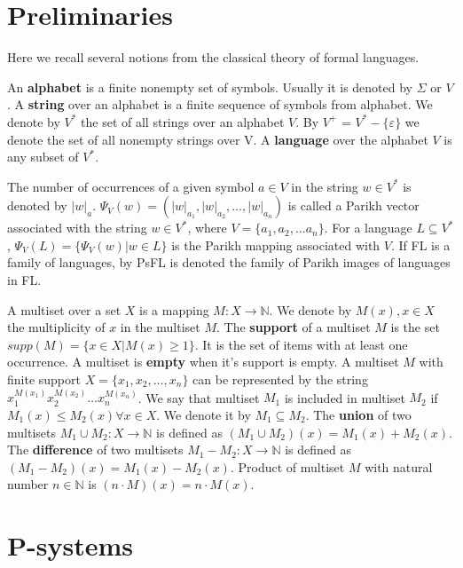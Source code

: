 \documentclass[a4paper,10pt]{article}
\def\eps{\varepsilon}
\begin{document}
\section{Preliminaries}
\label{sec:preliminaries}

Here we recall several notions from the classical theory of formal languages.

An {\bf alphabet} is a finite nonempty set of symbols. Usually it is denoted by $\Sigma$ or $V$. A {\bf string} over an alphabet is a finite sequence of symbols from alphabet. We denote by $V^*$ the set of all strings over an alphabet $V$. By $V^+$ = $V^* - \{\eps\}$ we denote the set of all nonempty strings over V. A {\bf language} over the alphabet $V$ is any subset of $V^*$.

The number of occurrences of a given symbol $a\in V$ in the string $w\in V^*$ is denoted by $|w|_a$. $\Psi_V(w)=(|w|_{a_1},|w|_{a_2},\dots,|w|_{a_n})$ is called a Parikh vector associated with the string $w\in V^*$, where $V=\{a_1,a_2,\dots a_n\}$. For a language $L\subseteq V^*$, $\Psi_V(L)=\{\Psi_V(w)|w\in L\}$ is the Parikh mapping associated with $V$. If FL is a family of languages, by PsFL is denoted the family of Parikh images of languages in FL.

A multiset over a set $X$ is a mapping $M: X\rightarrow \mathbb N$. We denote by $M(x), x\in X$ the multiplicity of $x$ in the multiset $M$. The {\bf support} of a multiset $M$ is the set $supp(M)=\{x\in X|M(x)\geq 1\}$. It is the set of items with at least one occurrence. A multiset is {\bf empty} when it's support is empty. A multiset $M$ with finite support $X = \{x_1, x_2, \dots, x_n\}$ can be represented by the string $x_1^{M(x_1)}x_2^{M(x_2)}\dots x_n^{M(x_n)}$. We say that multiset $M_1$ is included in multiset $M_2$ if $M_1(x)\leq M_2(x)\forall x \in X$. We denote it by $M_1\subseteq M_2$. The {\bf union} of two multisets $M_1\cup M_2 : X\rightarrow \mathbb N$ is defined as $(M_1\cup M_2)(x)=M_1(x)+M_2(x)$. The {\bf difference} of two multisets $M_1-M_2 : X\rightarrow \mathbb N$ is defined as $(M_1-M_2)(x)=M_1(x)-M_2(x)$. Product of multiset $M$ with natural number $n\in \mathbb N$ is $(n\cdot M)(x)=n\cdot M(x)$.
  
\section{P-systems}
\label{sec:p-systems}


\end{document}
